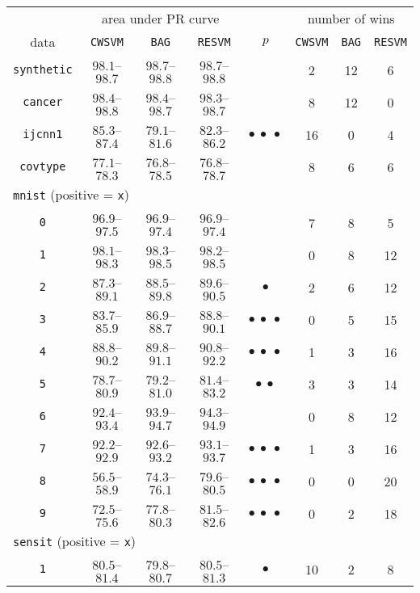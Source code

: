 \begin{table}[!h]
\centering
\begin{tabular}{cccccccc}
\toprule
 & \multicolumn{3}{c}{area under PR curve} & & \multicolumn{3}{c}{number of wins} \\ \cline{2-4} \cline{6-8}
data & \texttt{CWSVM} & \texttt{BAG} & \texttt{RESVM} & $p$ & \texttt{CWSVM} & \texttt{BAG} & \texttt{RESVM} \\
\midrule
\texttt{synthetic} & $98.1$--$98.7$ & $98.7$--$98.8$ & $98.7$--$98.8$ &  & 2 & 12 & 6\\
\texttt{cancer} & $98.4$--$98.8$ & $98.4$--$98.7$ & $98.3$--$98.7$ &  & 8 & 12 & 0\\
\texttt{ijcnn1} & $85.3$--$87.4$ & $79.1$--$81.6$ & $82.3$--$86.2$ & $\bullet\ \bullet\ \bullet$ & 16 & 0 & 4\\
\texttt{covtype} & $77.1$--$78.3$ & $76.8$--$78.5$ & $76.8$--$78.7$ &  & 8 & 6 & 6\\ 
\multicolumn{3}{l}{\texttt{mnist} (positive = \texttt{x})} \\
\texttt{0} & $96.9$--$97.5$ & $96.9$--$97.4$ & $96.9$--$97.4$ &  & 7 & 8 & 5\\ 
\texttt{1} & $98.1$--$98.3$ & $98.3$--$98.5$ & $98.2$--$98.5$ &  & 0 & 8 & 12\\ 
\texttt{2} & $87.3$--$89.1$ & $88.5$--$89.8$ & $89.6$--$90.5$ & $\bullet$ & 2 & 6 & 12\\ 
\texttt{3} & $83.7$--$85.9$ & $86.9$--$88.7$ & $88.8$--$90.1$ & $\bullet\ \bullet\ \bullet$ & 0 & 5 & 15\\ 
\texttt{4} & $88.8$--$90.2$ & $89.8$--$91.1$ & $90.8$--$92.2$ & $\bullet\ \bullet\ \bullet$ & 1 & 3 & 16\\ 
\texttt{5} & $78.7$--$80.9$ & $79.2$--$81.0$ & $81.4$--$83.2$ & $\bullet\ \bullet$ & 3 & 3 & 14\\ 
\texttt{6} & $92.4$--$93.4$ & $93.9$--$94.7$ & $94.3$--$94.9$ &  & 0 & 8 & 12\\ 
\texttt{7} & $92.2$--$92.9$ & $92.6$--$93.2$ & $93.1$--$93.7$ & $\bullet\ \bullet\ \bullet$ & 1 & 3 & 16\\ 
\texttt{8} & $56.5$--$58.9$ & $74.3$--$76.1$ & $79.6$--$80.5$ & $\bullet\ \bullet\ \bullet$ & 0 & 0 & 20\\ 
\texttt{9} & $72.5$--$75.6$ & $77.8$--$80.3$ & $81.5$--$82.6$ & $\bullet\ \bullet\ \bullet$ & 0 & 2 & 18\\ 
\multicolumn{3}{l}{\texttt{sensit} (positive = \texttt{x})} \\
\texttt{1} & $80.5$--$81.4$ & $79.8$--$80.7$ & $80.5$--$81.3$ & $\bullet$ & 10 & 2 & 8\\ 

\end{tabular}
\end{table}
